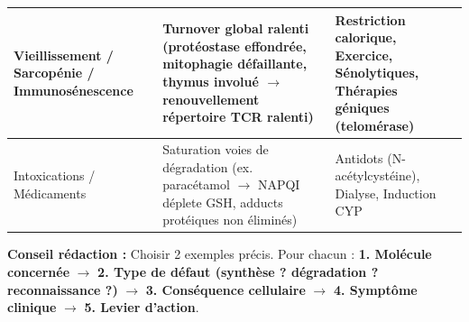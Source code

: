 \documentclass[11pt]{article}
\begin{document}
\begin{methode}
\begin{center}
\begin{tabular}{|l|l|l|}
Vieillissement / Sarcopénie / Immunosénescence & Turnover global ralenti (protéostase effondrée, mitophagie défaillante, thymus involué $\rightarrow$ renouvellement répertoire TCR ralenti) & Restriction calorique, Exercice, Sénolytiques, Thérapies géniques (telomérase) \\ \hline
Intoxications / Médicaments & Saturation voies de dégradation (ex. paracétamol $\rightarrow$ NAPQI déplete GSH, adducts protéiques non éliminés) & Antidots (N-acétylcystéine), Dialyse, Induction CYP \\ \hline
\end{tabular}
\end{center}
\textbf{Conseil rédaction :} Choisir 2 exemples précis. Pour chacun : \textbf{1. Molécule concernée} $\rightarrow$ \textbf{2. Type de défaut (synthèse ? dégradation ? reconnaissance ?)} $\rightarrow$ \textbf{3. Conséquence cellulaire} $\rightarrow$ \textbf{4. Symptôme clinique} $\rightarrow$ \textbf{5. Levier d'action}.
\end{methode}
\end{document}
